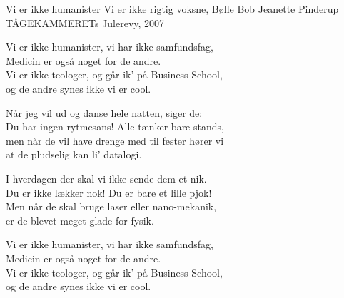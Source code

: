 \begin{song}{Vi er ikke humanister}
  {} %
  {Vi er ikke rigtig voksne, Bølle Bob} %
  {Jeanette Pinderup} %
  {TÅGEKAMMERETs Julerevy, 2007} %
  {\NotCCLIed} %

  \begin{SBChorus}
    Vi er ikke humanister, vi har ikke samfundsfag,\\
    Medicin er også noget for de andre.\\
    Vi er ikke teologer, og går ik’ på Business School,\\
    og de andre synes ikke vi er cool.
  \end{SBChorus}

  \begin{SBVerse}
    Når jeg vil ud og danse hele natten, siger de:\\
    Du har ingen rytmesans! Alle tænker bare stands,\\
    men når de vil have drenge med til fester hører vi\\
    at de pludselig kan li’ datalogi.
  \end{SBVerse}

  \begin{SBVerse}
    I hverdagen der skal vi ikke sende dem et nik.\\
    Du er ikke lækker nok! Du er bare et lille pjok!\\
    Men når de skal bruge laser eller nano-mekanik,\\
    er de blevet meget glade for fysik.
  \end{SBVerse}

  \begin{SBChorus}
    Vi er ikke humanister, vi har ikke samfundsfag,\\
    Medicin er også noget for de andre.\\
    Vi er ikke teologer, og går ik’ på Business School,\\
    og de andre synes ikke vi er cool.
  \end{SBChorus}



\end{song}
